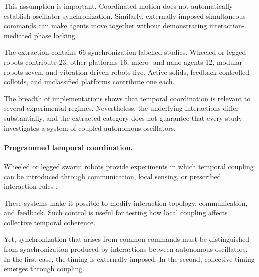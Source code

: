 This assumption is important.
Coordinated motion does not
automatically establish
oscillator synchronization.
Similarly, externally imposed
simultaneous commands can
make agents move together
without demonstrating
interaction-mediated
phase locking.

The extraction contains
66 synchronization-labelled
studies. Wheeled or legged
robots contribute 23,
other platforms 16,
micro- and nano-agents 12,
modular robots seven,
and vibration-driven
robots five. Active solids,
feedback-controlled colloids,
and unclassified platforms
contribute one each.

The breadth of implementations
shows that temporal coordination
is relevant to several
experimental regimes.
Nevertheless, the underlying
interactions differ substantially,
and the extracted category
does not guarantee that
every study investigates
a system of coupled
autonomous oscillators.

\paragraph*{Programmed temporal coordination.}

Wheeled or legged swarm robots
provide experiments in which
temporal coupling can be
introduced through communication,
local sensing, or prescribed
interaction rules
\cite{Chen2013aflockingalgorithm,Fruchart2022nonreciprocalphase,Cazenille2024hearingtheshapeof,Parker2010collectiveunarydec,PliegoJimnez2025ontheattitudecons,Zheng2024bodyorientationcha,Zheng2026nestedinteractionn,Salman2024automaticdesignof,Dizenhaus2026anonymousleadership,Wang2016aunifiedcommunicat,HaiTao2015algorithmsandexper,Min2011designandanalysis,Beattie2025realizingemergentc,Mao2014flockingofmultiro,Liu2024optimizationbasedf,Zhang2026noiseresilientimpl,Saladdino2026distributedcontrol,Chen2013algorithmsandexper,Mateo2019optimalnetworktopo,Raoufi2023individualityinswa,Ciuffo2022roboticcompetitions,Fan2013experimentsonflock,Fruchart2020phasetransitionsin}.

These systems make it possible
to modify interaction topology,
communication, and feedback.
Such control is useful for
testing how local coupling
affects collective temporal
coherence.

Yet, synchronization that
arises from common commands
must be distinguished from
synchronization produced
by interactions between
autonomous oscillators.
In the first case, the
timing is externally imposed.
In the second, collective
timing emerges through
coupling.

